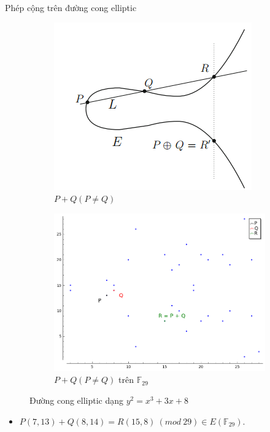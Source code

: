 \documentclass[compress]{beamer}
\begin{document}
\begin{frame}{Phép cộng trên đường cong elliptic}
\begin{figure}[h]
\begin{subfigure}{.5\textwidth}
  \centering
  \includegraphics[width=0.85\linewidth]{../im2.png}
  \caption{$P + Q (P \neq Q)$}
  \label{fig:sfig1}
\end{subfigure}%
\begin{subfigure}{.5\textwidth}
  \centering
  \includegraphics[width=1\linewidth]{../im13.png}
  \caption{$P + Q (P \neq Q)$ trên $\mathbb{F}_{29}$}
  \label{fig:sfig2}
\end{subfigure}
\caption*{Đường cong elliptic dạng $y^2 = x^3 + 3x + 8$}
\label{fig:fig}
\end{figure}
\begin{itemize}
\item \small{$P(7, 13) + Q(8, 14) = R(15, 8) \ (mod \ 29)\in E(\mathbb{F}_{29})$}.
\end{itemize}
\end{frame}
\end{document}
